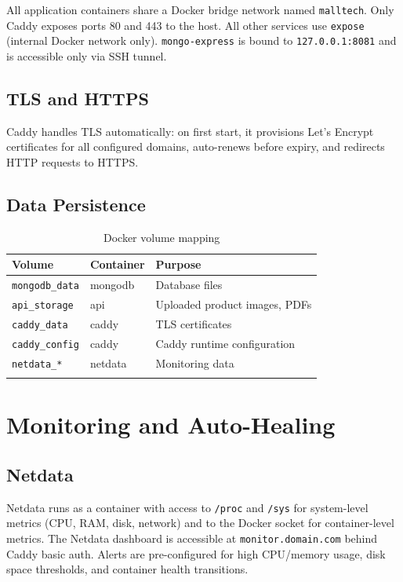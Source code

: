 All application containers share a Docker bridge network named \texttt{malltech}.
Only Caddy exposes ports 80 and 443 to the host. All other services use
\texttt{expose} (internal Docker network only). \texttt{mongo-express} is bound to
\texttt{127.0.0.1:8081} and is accessible only via SSH tunnel.

\subsection{TLS and HTTPS}

Caddy handles TLS automatically: on first start, it provisions Let's Encrypt
certificates for all configured domains, auto-renews before expiry, and redirects
HTTP requests to HTTPS.

\subsection{Data Persistence}

\begin{longtable}{|m{3cm}|m{3cm}|m{7.5cm}|}
    \hline
    \textbf{Volume}        & \textbf{Container} & \textbf{Purpose}              \\
    \hline
    \endhead
    \endfoot
    \endlastfoot
    \hline
    \texttt{mongodb\_data} & mongodb            & Database files                \\
    \hline
    \texttt{api\_storage}  & api                & Uploaded product images, PDFs \\
    \hline
    \texttt{caddy\_data}   & caddy              & TLS certificates              \\
    \hline
    \texttt{caddy\_config} & caddy              & Caddy runtime configuration   \\
    \hline
    \texttt{netdata\_*}    & netdata            & Monitoring data               \\
    \hline
    \caption{Docker volume mapping}
    \label{tab:volumes}
\end{longtable}

\section{Monitoring and Auto-Healing}

\subsection{Netdata}

Netdata runs as a container with access to \texttt{/proc} and \texttt{/sys} for
system-level metrics (CPU, RAM, disk, network) and to the Docker socket for
container-level metrics. The Netdata dashboard is accessible at
\texttt{monitor.domain.com} behind Caddy basic auth. Alerts are pre-configured
for high CPU/memory usage, disk space thresholds, and container health transitions.

